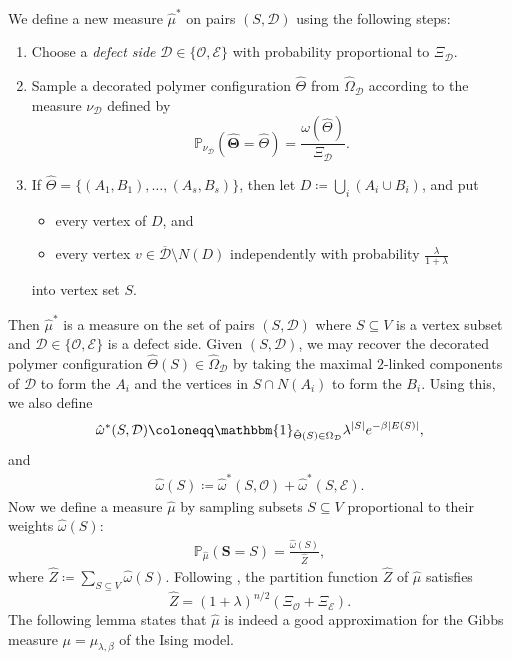 \documentclass[reqno,a4paper,11pt]{amsart}
\newcommand{\cD}{\mathcal{D}}
\newcommand{\cE}{\mathcal{E}}
\newcommand{\cO}{\mathcal{O}}
\newcommand{\lam}{\lambda}
\newcommand{\om}{\omega}
\newcommand{\Om}{\Omega}
\begin{document}
We define a new measure $\hat{\mu}^*$ on pairs $(S, \cD)$ using the following steps:
\begin{enumerate}
    \item Choose a \textit{defect side} $\cD\in\{\cO,\cE\}$ with probability proportional to $\Xi_{\cD}$.
    \item Sample a decorated polymer configuration $\hat{\Theta}$ from $\hat{\Om}_{\cD}$ according to the measure $\nu_\cD$ defined by
    $$\mathbb{P}_{\nu_{\cD}}(\boldsymbol{\hat{\Theta}}=\hat{\Theta})=\frac{\om(\hat{\Theta})}{\Xi_\cD}.$$
    \item If $\hat{\Theta}=\{(A_1,B_1),\dots, (A_s,B_s)\}$, then let $D \coloneqq \bigcup_i(A_i\cup B_i)$, and put 
    \begin{itemize}
        \item every vertex of $D$, and
        \item every vertex $v\in\overline{\cD} \setminus N(D)$ independently with probability $\frac{\lam}{1+\lam}$
    \end{itemize}
    into vertex set $S$.
\end{enumerate}
Then $\hat{\mu}^*$ is a measure on the set of pairs $(S, \cD)$ where $S \subseteq V$ is a vertex subset and $\cD \in \{\cO, \cE\}$ is a defect side. Given $(S, \cD)$, we may recover the decorated polymer configuration $\hat{\Theta}(S) \in \hat{\Om}_{\cD}$ by taking the maximal $2$-linked components of $\cD$ to form the $A_i$ and the vertices in $S \cap N(A_i)$ to form the $B_i$. Using this, we also define
\begin{align*}
    \hat{\om}^*(S, \cD) \coloneqq \mathbbm{1}_{\hat{\Theta}(S) \in \Om_\cD} \lam^{|S|} e^{- \beta |E(S)|},
\end{align*}
and
\begin{align*}
\hat{\om}(S) \coloneqq \hat{\om}^*(S, \cO)+\hat{\om}^*(S, \cE).
\end{align*}
Now we define a measure $\hat{\mu}$ by sampling subsets $S \subseteq V$ proportional to their weights $\hat{\om}(S)$:
\begin{align*}
\mathbb{P}_{\hat{\mu}}(\mathbf{S}=S)=\frac{\hat{\om}(S)}{\hat{Z}},
\end{align*}
where $\hat{Z} \coloneqq \sum_{S \subseteq V} \hat{\om}(S)$.
Following \cite{GeKaSaWdo25}, the partition function $\hat{Z}$ of $\hat{\mu}$ satisfies 
$$\hat{Z}=(1+\lam)^{n/2}(\Xi_{\cO}+\Xi_{\cE}).$$
The following lemma states that $\hat{\mu}$ is indeed a good approximation for the Gibbs measure $\mu= \mu_{\lambda, \beta}$ of the Ising model.
\end{document}
